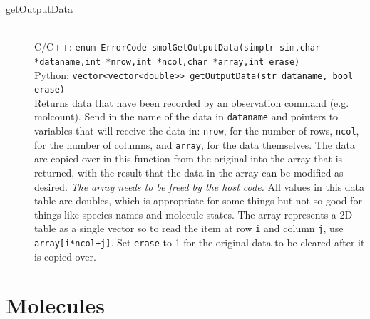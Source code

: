\documentclass {scrbook}
\newcommand {\ttt} {\texttt}
\begin{document}
\begin{description}
\item[getOutputData]
\hfill \\
C/C++: \ttt{enum ErrorCode smolGetOutputData(simptr sim,char *dataname,int *nrow,int *ncol,char *array,int erase)}\\
Python: \ttt{vector<vector<double>> getOutputData(str dataname, bool erase)}\\
Returns data that have been recorded by an observation command (e.g. molcount). Send in the name of the data in \ttt{dataname} and pointers to variables that will receive the data in: \ttt{nrow}, for the number of rows, \ttt{ncol}, for the number of columns, and \ttt{array}, for the data themselves. The data are copied over in this function from the original into the array that is returned, with the result that the data in the array can be modified as desired. \textit{The array needs to be freed by the host code.} All values in this data table are doubles, which is appropriate for some things but not so good for things like species names and molecule states. The array represents a 2D table as a single vector so to read the item at row \ttt{i} and column \ttt{j}, use \ttt{array[i*ncol+j]}. Set \ttt{erase} to 1 for the original data to be cleared after it is copied over.

\end{description}

\section{Molecules}
\end{document}
